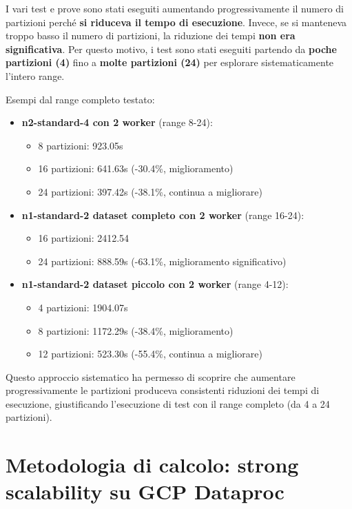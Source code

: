 \documentclass[8pt,a4paper]{article}
\begin{document}
I vari test e prove sono stati eseguiti aumentando progressivamente il numero di partizioni perché \textbf{si riduceva il tempo di esecuzione}. Invece, se si manteneva troppo basso il numero di partizioni, la riduzione dei tempi \textbf{non era significativa}. 
\noindent
Per questo motivo, i test sono stati eseguiti partendo da \textbf{poche partizioni (4)} fino a \textbf{molte partizioni (24)} per esplorare sistematicamente l'intero range.

Esempi dal range completo testato:

\begin{itemize}
    \item \textbf{n2-standard-4 con 2 worker} (range 8-24):
    \begin{itemize}
        \item 8 partizioni: 923.05s
        \item 16 partizioni: 641.63s (-30.4\%, miglioramento)
        \item 24 partizioni: 397.42s (-38.1\%, continua a migliorare)
    \end{itemize}
    
    \item \textbf{n1-standard-2 dataset completo con 2 worker} (range 16-24):
    \begin{itemize}
        \item 16 partizioni: 2412.54
        \item 24 partizioni: 888.59s (-63.1\%, miglioramento significativo)
    \end{itemize}
    
    \item \textbf{n1-standard-2 dataset piccolo con 2 worker} (range 4-12):
    \begin{itemize}
        \item 4 partizioni: 1904.07s 
        \item 8 partizioni: 1172.29s (-38.4\%, miglioramento)
        \item 12 partizioni: 523.30s (-55.4\%, continua a migliorare)
    \end{itemize}
\end{itemize}
\noindent
Questo approccio sistematico ha permesso di scoprire che aumentare progressivamente le partizioni produceva consistenti riduzioni dei tempi di esecuzione, giustificando l'esecuzione di test con il range completo (da 4 a 24 partizioni).


\section{Metodologia di calcolo: strong scalability su GCP Dataproc}
\end{document}
